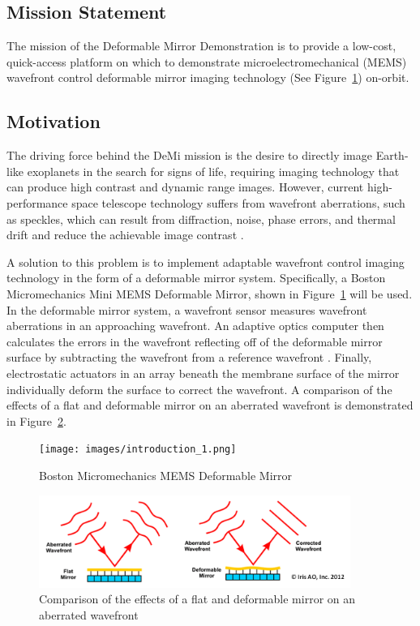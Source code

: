 \documentclass[12pt]{article}
\begin{document}
\subsection{Mission Statement}
The mission of the Deformable Mirror Demonstration is to provide a low-cost, quick-access platform on which to demonstrate microelectromechanical (MEMS) wavefront control deformable mirror imaging technology (See Figure~\ref{fig:Intro_demi}) on-orbit.

\subsection{Motivation}
The driving force behind the DeMi mission is the desire to directly image Earth-like exoplanets in the search for signs of life, requiring imaging technology that can produce high contrast and dynamic range images.  However, current high-performance space telescope technology suffers from wavefront aberrations, such as speckles, which can result from diffraction, noise, phase errors, and thermal drift and reduce the achievable image contrast \cite{cahoy-unpublished}.

A solution to this problem is to implement adaptable wavefront control imaging technology in the form of a deformable mirror system. Specifically, a Boston Micromechanics
Mini MEMS Deformable Mirror, shown in Figure~\ref{fig:Intro_demi} will be used. In the deformable mirror system, a wavefront sensor measures wavefront aberrations in an approaching wavefront. An adaptive optics computer then calculates the errors in the wavefront reflecting off of the deformable mirror surface by subtracting the wavefront from a reference wavefront \cite{adaptive-optics-overview}. Finally, electrostatic actuators in an array beneath the membrane surface of the mirror individually deform the surface to correct the wavefront. A comparison of the effects of a flat and deformable mirror on an aberrated wavefront is demonstrated in Figure~\ref{fig:Intro_wavefront}.   

\begin{figure}[!ht]
\centering
\texttt{[image: images/introduction\_1.png]}
\caption{Boston Micromechanics MEMS Deformable Mirror \cite{bos-micro-demi}}
\label{fig:Intro_demi}
\end{figure}

\begin{figure}[!ht]
\centering
\includegraphics[width=4in]{images/introduction_2.png}
\caption{Comparison of the effects of a flat and deformable mirror on an aberrated wavefront}
\label{fig:Intro_wavefront}
\end{figure}
\end{document}
